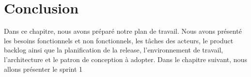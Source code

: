 \section*{Conclusion}
Dans ce chapitre, nous avons préparé notre plan de travail. Nous avons présenté les besoins fonctionnels et non fonctionnels, les tâches des acteurs, le product backlog ainsi que la planification de la release, l'environnement de travail, l'architecture et le patron de conception à adopter. Dans le chapitre suivant, nous allons présenter le sprint 1